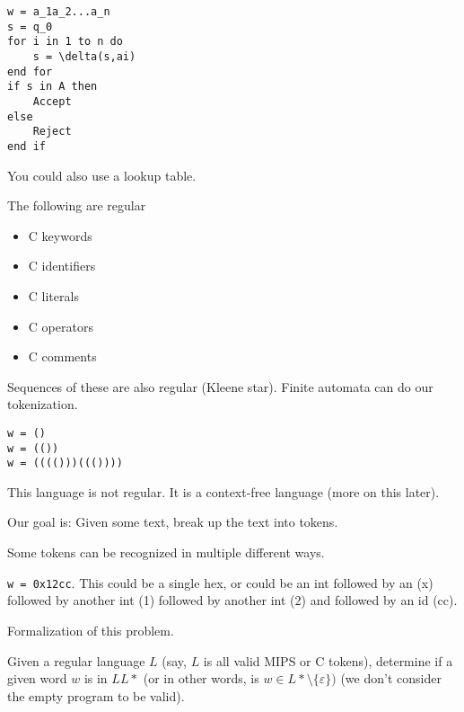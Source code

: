 \documentclass{article}
\begin{document}
\begin{tcolorbox}
\begin{verbatim}
w = a_1a_2...a_n
s = q_0
for i in 1 to n do
    s = \delta(s,ai)
end for
if s in A then
    Accept
else
    Reject
end if
\end{verbatim}
\end{tcolorbox}

You could also use a lookup table.



The following are regular
\begin{itemize}
    \item C keywords
    \item C identifiers
    \item C literals
    \item C operators
    \item C comments
\end{itemize}


Sequences of these are also regular (Kleene star). Finite automata can
do our tokenization.


\begin{tcolorbox}
\begin{verbatim}
w = ()
w = (())
w = (((()))((())))
\end{verbatim}
\end{tcolorbox}

This language is not regular. It is a context-free language (more on
this later).


Our goal is: Given some text, break up the text into tokens.

Some tokens can be recognized in multiple different ways.

\texttt{w\ =\ 0x12cc}. This could be a single hex, or could be an int
followed by an (x) followed by another int (1) followed by another int
(2) and followed by an id (cc).

Formalization of this problem.

Given a regular language \(L\) (say, \(L\) is all valid MIPS or C
tokens), determine if a given word \(w\) is in \(LL*\) (or in other
words, is \(w \in L * \setminus \{\varepsilon\})\) (we don't consider
the empty program to be valid).
\end{document}

